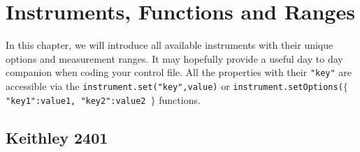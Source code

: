 \chapter{Instruments, Functions and Ranges}

\lettrine[lines=2]{\color{blue}\textsf{I}}{}n this chapter, we will introduce all available instruments with their unique options and measurement ranges. It may hopefully provide a useful day to day companion when coding your control file. All the properties with their \texttt{"key"} are accessible via the \texttt{instrument.set("key",value)} or \texttt{instrument.setOptions($\lbrace$"key1":value1, "key2":value2 $\rbrace $} functions.

\section{Keithley 2401}

